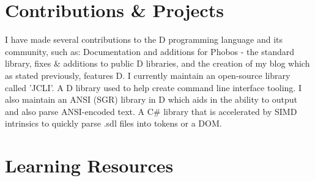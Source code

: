 \documentclass[11pt,a4paper,sans]{moderncv}
\begin{document}
\section{Contributions \& Projects}
{
    I have made several contributions to the D programming language and its community, such as:
    Documentation and additions for Phobos - the standard library, fixes \& additions to public D libraries, and the creation of my blog
    which as stated previously, features D.
}
{
    I currently maintain an open-source library called 'JCLI'. A D library used to help create
    command line interface tooling.
}
{
    I also maintain an ANSI (SGR) library in D which aids in the ability to output and also parse ANSI-encoded text.
}
{
    A C\# library that is accelerated by SIMD intrinsics to quickly parse .sdl files into tokens or a DOM.
}

\section{Learning Resources}

\fi
\end{document}
